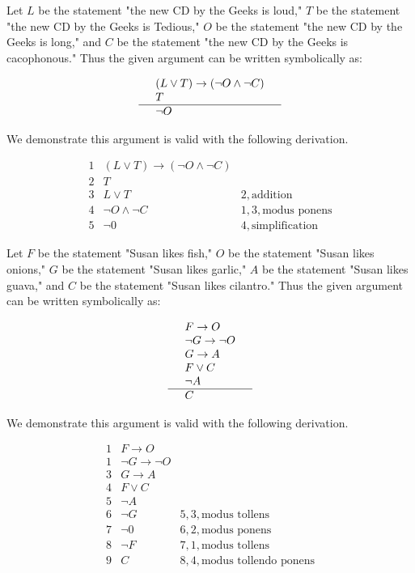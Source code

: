 \documentclass{article}
\theoremstyle{definition}
\begin{document}
	\noindent {}  \vspace{0.2cm}

	Let $L$ be the statement "the new CD by the Geeks is loud," $T$ be
	the statement "the new CD by the Geeks is Tedious," $O$ be the
	statement "the new CD by the Geeks is long," and $C$ be the
	statement "the new CD by the Geeks is cacophonous." Thus the given
	argument can be written symbolically as:

	$$\begin{array}{llr}
		  & (L\vee T)\rightarrow (\neg O \wedge \neg C) &\\
		  & T&\\\hline
		  & \neg O &
	\end{array}$$

	We demonstrate this argument is valid with the following derivation.

	$$\begin{array}{llr}
		  1 & (L\vee T)\rightarrow (\neg O \wedge \neg C) &\\
		  2 & T&\\\hline 3 & L\vee T & 2, \mbox{addition}\\
		  4 & \neg O \wedge \neg C & 1, 3, \mbox{modus ponens}\\
		  5 & \neg 0 & 4, \mbox{simplification}
	\end{array}$$

	\vspace{0.25cm}

	\noindent {} \vspace{0.2cm}

	Let $F$ be the statement "Susan likes fish," $O$ be the statement
	"Susan likes onions," $G$ be the statement "Susan likes garlic," $A$
	be the statement "Susan likes guava," and $C$ be the statement
	"Susan likes cilantro." Thus the given argument can be written
	symbolically as:

	$$\begin{array}{llr}
		  & F\rightarrow O &\\
		  & \neg G \rightarrow \neg O&\\
		  & G\rightarrow A& \\
		  & F\vee C& \\
		  & \neg A &\\\hline
		  & C &
	\end{array}$$

	We demonstrate this argument is valid with the following derivation.

	$$\begin{array}{llr}
		  1  & F\rightarrow O &\\
		  1 & \neg G \rightarrow \neg O&\\
		  3 & G\rightarrow A& \\
		  4 & F\vee C& \\
		  5 & \neg A &\\\hline 6 & \neg G & 5, 3, \mbox{modus tollens}\\
		  7 & \neg 0 & 6, 2, \mbox{modus ponens}\\
		  8 & \neg F & 7, 1, \mbox{modus tollens}\\
		  9 & C & 8, 4, \mbox{modus tollendo ponens}
	\end{array}$$
\end{document}
